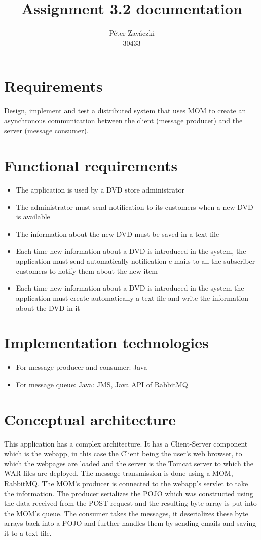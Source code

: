 \documentclass[a4paper,10pt]{report}
\title{Assignment 3.2 documentation}
\author{Péter Zaváczki\\30433}
\begin{document}
\maketitle

\section{Requirements}
Design, implement and test a distributed system that uses MOM to create an asynchronous
communication between the client (message producer) and the server (message consumer). 

\section{Functional requirements}
\begin{itemize}
    \item The application is used by a DVD store administrator
    \item The administrator must send notification to its customers when a new DVD is available
    \item The information about the new DVD must be saved in a text file
    \item Each time new information about a DVD is introduced in the system, the application must send automatically notification e-mails to all the subscriber customers to notify them about the new item
    \item Each time new information about a DVD is introduced in the system the application must create automatically a text file and write the information about the DVD in it    
\end{itemize}

\section{Implementation technologies}
\begin{itemize}
    \item For message producer and consumer: Java
    \item For message queue: Java: JMS, Java API of RabbitMQ
\end{itemize}

\section{Conceptual architecture}
This application has a complex architecture. It has a Client-Server component which is the webapp, in this case the Client being the user's web browser, to which the webpages are loaded and the server is the Tomcat server to which the WAR files are deployed.
The message transmission is done using a MOM, RabbitMQ. The MOM's producer is connected to the webapp's servlet to take the information. The producer serializes the POJO which was constructed using the data received from the POST request and the resulting byte array is put into the MOM's queue. The consumer takes the messages, it deserializes these byte arrays back into a POJO and further handles them by sending emails and saving it to a text file.
\end{document}
